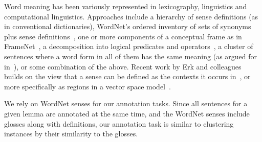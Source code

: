 \documentclass[11pt]{article}
\begin{document}
Word meaning has been variously represented in lexicography,
linguistics and computational linguistics. Approaches include a
hierarchy of sense definitions (as in conventional dictionaries),
WordNet's ordered inventory of sets of synonyms plus sense
definitions~\cite{millerEtAl93}, one or more components of a
conceptual frame as in FrameNet~\cite{fillmoreEtAl03}, a decomposition
into logical predicates and operators~\cite{dowty79}, a cluster of
sentences where a word form in all of them has the same meaning (as
argued for in~\cite{kilgarriff97}), or some combination of the above.
Recent work by Erk and colleagues builds on the view that a sense can
be defined as the contexts it occurs in~\cite{kilgarriff97}, or more
specifically as regions in a vector space model~\cite{erk09}. 

We rely on WordNet senses for our annotation tasks. Since all
sentences for a given lemma are annotated at the same time, and the
WordNet senses include glosses along with definitions, our annotation
task is similar to clustering instances by their similarity to the
glosses.
\end{document}
